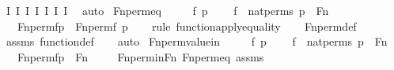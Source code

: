 \begin{isabellebody}
\ I{}\ I{}\ I{}\ I{}\ I{}\ I{}\ I{}\ \isamarkupfalse%
\ auto\isanewline
{}\isamarkupfalse%
%
\endisatagproof
{\isafoldproof}%
%
\isadelimproof
\isanewline
%
\endisadelimproof
\isanewline
{}\isamarkupfalse%
\ Fn{\isacharunderscore}{\kern0pt}perm{\isacharprime}{\kern0pt}{\isacharunderscore}{\kern0pt}eq\ {\isacharcolon}{\kern0pt}\ \isanewline
\ \ \ f\ p\ \isanewline
\ \ \ {\isachardoublequoteopen}f\ {\isasymin}\ nat{\isacharunderscore}{\kern0pt}perms{\isachardoublequoteclose}\ {\isachardoublequoteopen}p\ {\isasymin}\ Fn{\isachardoublequoteclose}\ \ \isanewline
\ \ \ {\isachardoublequoteopen}Fn{\isacharunderscore}{\kern0pt}perm{\isacharprime}{\kern0pt}{\isacharparenleft}{\kern0pt}f{\isacharparenright}{\kern0pt}{\isacharbackquote}{\kern0pt}p\ {\isacharequal}{\kern0pt}\ Fn{\isacharunderscore}{\kern0pt}perm{\isacharparenleft}{\kern0pt}f{\isacharcomma}{\kern0pt}\ p{\isacharparenright}{\kern0pt}{\isachardoublequoteclose}\ \isanewline
%
\isadelimproof
\ \ %
\endisadelimproof
%
\isatagproof
{}\isamarkupfalse%
{\isacharparenleft}{\kern0pt}rule\ function{\isacharunderscore}{\kern0pt}apply{\isacharunderscore}{\kern0pt}equality{\isacharparenright}{\kern0pt}\isanewline
\ \ \isamarkupfalse%
\ Fn{\isacharunderscore}{\kern0pt}perm{\isacharprime}{\kern0pt}{\isacharunderscore}{\kern0pt}def\ \isanewline
\ \ \isamarkupfalse%
\ assms\ function{\isacharunderscore}{\kern0pt}def\isanewline
\ \ \isamarkupfalse%
\ auto%
\endisatagproof
{\isafoldproof}%
%
\isadelimproof
\isanewline
%
\endisadelimproof
\isanewline
{}\isamarkupfalse%
\ Fn{\isacharunderscore}{\kern0pt}perm{\isacharprime}{\kern0pt}{\isacharunderscore}{\kern0pt}value{\isacharunderscore}{\kern0pt}in\ {\isacharcolon}{\kern0pt}\ \isanewline
\ \ \ f\ p\ \isanewline
\ \ \ {\isachardoublequoteopen}f\ {\isasymin}\ nat{\isacharunderscore}{\kern0pt}perms{\isachardoublequoteclose}\ {\isachardoublequoteopen}p\ {\isasymin}\ Fn{\isachardoublequoteclose}\ \isanewline
\ \ \ {\isachardoublequoteopen}Fn{\isacharunderscore}{\kern0pt}perm{\isacharprime}{\kern0pt}{\isacharparenleft}{\kern0pt}f{\isacharparenright}{\kern0pt}{\isacharbackquote}{\kern0pt}p\ {\isasymin}\ Fn{\isachardoublequoteclose}\ \isanewline
%
\isadelimproof
\isanewline
\ \ %
\endisadelimproof
%
\isatagproof
{}\isamarkupfalse%
\ Fn{\isacharunderscore}{\kern0pt}perm{\isacharunderscore}{\kern0pt}in{\isacharunderscore}{\kern0pt}Fn\ Fn{\isacharunderscore}{\kern0pt}perm{\isacharprime}{\kern0pt}{\isacharunderscore}{\kern0pt}eq\ assms\isanewline

\end{isabellebody}
